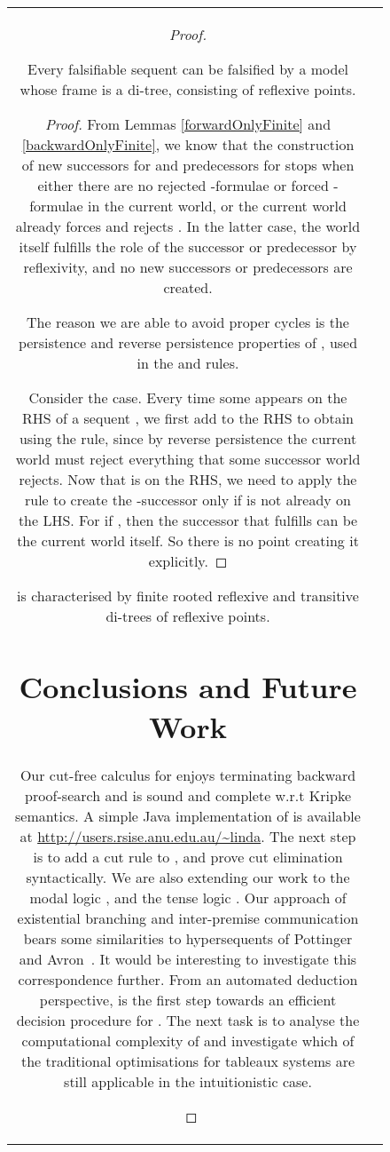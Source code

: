 \documentclass{llncs}
\numberwithin{equation}{section}
\begin{document}
\begin{figure}[t]
\begin{tabular}{cc}
\begin{proof}
\begin{enumerate}
\begin{theorem}
Every falsifiable  sequent can be falsified by a model whose frame is a di-tree, consisting of reflexive points.
\end{theorem}
\begin{proof}
From Lemmas \ref{forwardOnlyFinite} and \ref{backwardOnlyFinite}, we know that the construction of new successors for  and predecessors for  stops when either there are no rejected -formulae or forced -formulae in the current world, or the current world already forces  and rejects . In the latter case, the world itself fulfills the role of the successor or predecessor by reflexivity, and no new successors or predecessors are created.

The reason we are able to avoid proper cycles is the persistence and reverse persistence properties of , used in the  and  rules.

Consider the  case. Every time some  appears on the RHS of a sequent , we first add  to the RHS to obtain  using the  rule, since by reverse persistence the current world must reject everything that some successor world rejects. Now that  is on the RHS, we need to apply the  rule to create the -successor  only if  is not already on the LHS. For if , then the successor  that fulfills  can be the current world itself. So there is no point creating it explicitly.
\end{proof}

\begin{corollary}
 is characterised by finite rooted reflexive and transitive di-trees of reflexive points.
\end{corollary}

\section{Conclusions and Future Work}\label{sec:conclusion}

Our cut-free calculus for  enjoys terminating backward
proof-search and is sound and complete w.r.t Kripke semantics.  A
simple Java implementation of  is available at
\url{http://users.rsise.anu.edu.au/~linda}.
The next step is to add a cut rule to , and prove cut
elimination syntactically. We are also extending our work to the modal logic , and the tense
logic . Our approach of existential branching and inter-premise communication bears some similarities to hypersequents of Pottinger and Avron~\cite{avron1996}. It would be interesting to investigate this correspondence further. From an automated deduction perspective,  is the first step towards an efficient decision procedure for . The next task is to analyse the computational complexity of  and investigate which of the traditional optimisations for tableaux systems are still applicable in the intuitionistic case.


\end{enumerate}
\end{proof}
\end{tabular}
\end{figure}
\end{document}
